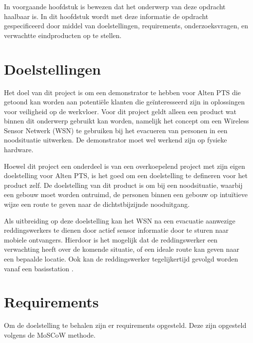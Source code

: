 \documentclass{../local}
\begin{document}
In voorgaande hoofdstuk is bewezen dat het onderwerp van deze opdracht haalbaar is. In dit hoofdstuk wordt met deze informatie de opdracht gespecificeerd door middel van doelstellingen, requirements, onderzoeksvragen, en verwachtte eindproducten op te stellen.

\section{Doelstellingen}
Het doel van dit project is om een demonstrator te hebben voor Alten PTS die getoond kan worden aan potentiële klanten die geïnteresseerd zijn in oplossingen voor veiligheid op de werkvloer. Voor dit project geldt alleen een product wat binnen dit onderwerp gebruikt kan worden, namelijk het concept om een Wireless Sensor Netwerk (WSN) te gebruiken bij het evacueren van personen in een noodsituatie uitwerken. De demonstrator moet wel werkend zijn op fysieke hardware.

Hoewel dit project een onderdeel is van een overkoepelend project met zijn eigen doelstelling voor Alten PTS, is het goed om een doelstelling te defineren voor het product zelf. De doelstelling van dit product is om bij een noodsituatie, waarbij een gebouw moet worden ontruimd, de personen binnen een gebouw op intuïtieve wijze een route te geven naar de dichtstbijzijnde nooduitgang. 

Als uitbreiding op deze doelstelling kan het WSN na een evacuatie aanwezige reddingswerkers te dienen door actief sensor informatie door te sturen naar mobiele ontvangers. Hierdoor is het mogelijk dat de reddingswerker een verwachting heeft over de komende situatie, of een ideale route kan geven naar een bepaalde locatie. Ook kan de reddingswerker tegelijkertijd gevolgd worden vanaf een basisstation \cite{ShaWSN}.

\section{Requirements}
Om de doelstelling te behalen zijn er requirements opgesteld. Deze zijn opgesteld volgens de MoSCoW methode. 
\\\\
\end{document}
